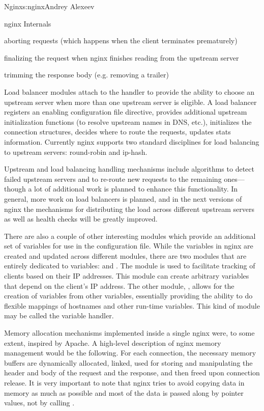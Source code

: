 \begin{aosachapter}{Nginx}{s:nginx}{Andrey Alexeev}
\begin{aosasect1}{nginx Internals}
\begin{aosaitemize}
\item aborting requests (which happens when the client terminates
  prematurely)

\item finalizing the request when nginx finishes reading from the
  upstream server

\item trimming the response body (e.g. removing a trailer)

\end{aosaitemize}

Load balancer modules attach to the  handler to
provide the ability to choose an upstream server when more than one
upstream server is eligible. A load balancer registers an enabling
configuration file directive, provides additional upstream
initialization functions (to resolve upstream names in DNS, etc.),
initializes the connection structures, decides where to route the
requests, updates stats %
information. Currently nginx supports two standard disciplines for
load balancing to upstream servers: round-robin and ip-hash.

Upstream and load balancing handling mechanisms include algorithms to
detect failed upstream servers and to re-route new requests to the
remaining ones---though a lot of additional work is planned to enhance
this functionality. In general, more work on load balancers is
planned, and in the next versions of nginx the mechanisms for
distributing the load across different upstream servers as well as
health checks will be greatly improved.

There are also a couple of other interesting modules which provide an
additional set of variables for use in the configuration file. While
the variables in nginx are created and updated across different
modules, there are two modules that are entirely dedicated to
variables:  and . The  module is used to
facilitate tracking of clients based on their IP addresses. This
module can create arbitrary variables that depend on the client's IP
address. The other module, , allows for the creation of
variables from other variables, essentially providing the ability to
do flexible mappings of hostnames and other run-time variables. This
kind of module may be called the variable handler.

Memory allocation mechanisms implemented inside a single nginx
 were, to some extent, inspired by Apache. A high-level
description of nginx memory management would be the following. For
each connection, the necessary memory buffers are dynamically
allocated, linked, used for storing and manipulating the header and
body of the request and the response, and then freed upon connection
release. It is very important to note that nginx tries to avoid
copying data in memory as much as possible and most of the data is
passed along by pointer values, not by calling .


\end{aosasect1}
\end{aosachapter}

